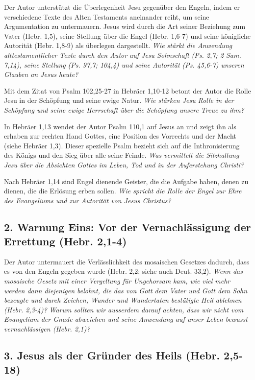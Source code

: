 \documentclass[]{krantz}
\begin{document}
Der Autor unterstützt die Überlegenheit Jesu gegenüber den Engeln, indem
er verschiedene Texte des Alten Testaments aneinander reiht, um seine
Argumentation zu untermauern. Jesus wird durch die Art seiner Beziehung
zum Vater (Hebr. 1,5), seine Stellung über die Engel (Hebr. 1,6-7) und
seine königliche Autorität (Hebr. 1,8-9) als überlegen dargestellt.
\emph{Wie stärkt die Anwendung alttestamentlicher Texte durch den Autor
auf Jesu Sohnschaft (Ps. 2,7; 2 Sam. 7,14), seine Stellung (Ps. 97,7;
104,4) und seine Autorität (Ps. 45,6-7) unseren Glauben an Jesus heute?}

Mit dem Zitat von Psalm 102,25-27 in Hebräer 1,10-12 betont der Autor
die Rolle Jesu in der Schöpfung und seine ewige Natur. \emph{Wie stärken
Jesu Rolle in der Schöpfung und seine ewige Herrschaft über die
Schöpfung unsere Treue zu ihm?}

In Hebräer 1,13 wendet der Autor Psalm 110,1 auf Jesus an und zeigt ihn
als erhaben zur rechten Hand Gottes, eine Position des Vorrechts und der
Macht (siehe Hebräer 1,3). Dieser spezielle Psalm bezieht sich auf die
Inthronisierung des Königs und den Sieg über alle seine Feinde.
\emph{Was vermittelt die Sitzhaltung Jesu über die Absichten Gottes im
Leben, Tod und in der Auferstehung Christi?}

Nach Hebräer 1,14 sind Engel dienende Geister, die die Aufgabe haben,
denen zu dienen, die die Erlösung erben sollen. \emph{Wie spricht die
Rolle der Engel zur Ehre des Evangeliums und zur Autorität von Jesus
Christus?}

\subsection{2. Warnung Eins: Vor der Vernachlässigung der Errettung
(Hebr.
2,1-4)}\label{warnung-eins-vor-der-vernachluxe4ssigung-der-errettung-hebr.-21-4}

Der Autor untermauert die Verlässlichkeit des mosaischen Gesetzes
dadurch, dass es von den Engeln gegeben wurde (Hebr. 2,2; siehe auch
Deut. 33,2). \emph{Wenn das mosaische Gesetz mit einer Vergeltung für
Ungehorsam kam, wie viel mehr werden dann diejenigen belohnt, die das
von Gott dem Vater und Gott dem Sohn bezeugte und durch Zeichen, Wunder
und Wundertaten bestätigte Heil ablehnen (Hebr. 2,3-4)?} \emph{Warum
sollten wir ausserdem darauf achten, dass wir nicht vom Evangelium der
Gnade abweichen und seine Anwendung auf unser Leben bewusst
vernachlässigen (Hebr. 2,1)?}

\subsection{3. Jesus als der Gründer des Heils (Hebr.
2,5-18)}\label{jesus-als-der-gruxfcnder-des-heils-hebr.-25-18}
\end{document}
